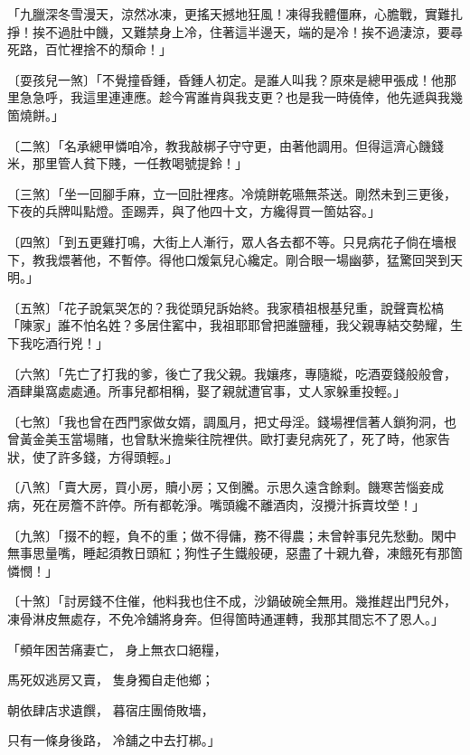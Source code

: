 「九臘深冬雪漫天，涼然冰凍，更搖天撼地狂風！凍得我體僵麻，心膽戰，實難扎掙！挨不過肚中饑，又難禁身上冷，住著這半邊天，端的是冷！挨不過淒涼，要尋死路，百忙裡捨不的頹命！」

〔耍孩兒一煞〕「不覺撞昏鍾，昏鍾人初定。是誰人叫我？原來是總甲張成！他那里急急呼，我這里連連應。趁今宵誰肯與我支更？也是我一時僥倖，他先遞與我幾箇燒餅。」

〔二煞〕「名承總甲憐咱冷，教我敲梆子守守更，由著他調用。但得這濟心饑錢米，那里管人貧下賤，一任教喝號提鈴！」

〔三煞〕「坐一回腳手麻，立一回肚裡疼。冷燒餅乾嚥無茶送。剛然未到三更後，下夜的兵牌叫點燈。歪踢弄，與了他四十文，方纔得買一箇姑容。」

〔四煞〕「到五更雞打鳴，大街上人漸行，眾人各去都不等。只見病花子倘在墻根下，教我煨著他，不暫停。得他口煖氣兒心纔定。剛合眼一場幽夢，猛驚回哭到天明。」

〔五煞〕「花子說氣哭怎的？我從頭兒訴始終。我家積祖根基兒重，說聲賣松槁「陳家」誰不怕名姓？多居住窰中，我祖耶耶曾把誰鹽種，我父親專結交勢耀，生下我吃酒行兇！」

〔六煞〕「先亡了打我的爹，後亡了我父親。我孃疼，專隨縱，吃酒耍錢般般會，酒肆巢窩處處通。所事兒都相稱，娶了親就遭官事，丈人家躲重投輕。」

〔七煞〕「我也曾在西門家做女婿，調風月，把丈母淫。錢場裡信著人鎖狗洞，也曾黃金美玉當場賭，也曾馱米擔柴往院裡供。歐打妻兒病死了，死了時，他家告狀，使了許多錢，方得頭輕。」

〔八煞〕「賣大房，買小房，贖小房；又倒騰。示思久遠含餘剩。饑寒苦惱妾成病，死在房簷不許停。所有都乾淨。嘴頭纔不離酒肉，沒攪汁拆賣坟塋！」

〔九煞〕「掇不的輕，負不的重；做不得傭，務不得農；未曾幹事兒先愁動。閑中無事思量嘴，睡起須教日頭紅；狗性子生鐵般硬，惡盡了十親九眷，凍餓死有那箇憐憫！」

〔十煞〕「討房錢不住催，他料我也住不成，沙鍋破碗全無用。幾推趕出門兒外，凍骨淋皮無處存，不免冷舖將身奔。但得箇時通運轉，我那其間忘不了恩人。」

「頻年困苦痛妻亡，  身上無衣口絕糧，

馬死奴逃房又賣，  隻身獨自走他鄉；

朝依肆店求遺饌，  暮宿庄團倚敗墻，

只有一條身後路，  冷舖之中去打梆。」


